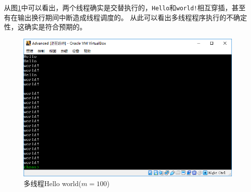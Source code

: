 \documentclass[logo,reportComp]{thesis}
\begin{document}
从图\ref{fig:hello_world_2}中可以看出，两个线程确实是交替执行的，\verb'Hello'和\verb'world!'相互穿插，甚至有在输出换行期间中断造成线程调度的。
从此可以看出多线程程序执行的不确定性，这确实是符合预期的。
\begin{figure}[H]
\centering
\includegraphics[width=0.8\linewidth]{fig/hello_world_2.PNG}
\caption{多线程Hello world($m=100$)}
\label{fig:hello_world_2}
\end{figure}
\end{document}
